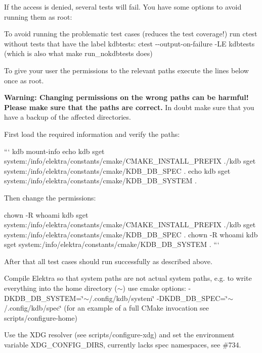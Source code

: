 If the access is denied, several tests will fail. You have some options to avoid running them as root\+:


\begin{DoxyEnumerate}
\item To avoid running the problematic test cases (reduces the test coverage!) run {\ttfamily ctest} without tests that have the label {\ttfamily kdbtests}\+: {\ttfamily ctest -\/-\/output-\/on-\/failure -\/\+LE kdbtests} (which is also what {\ttfamily make run\+\_\+nokdbtests} does)
\item To give your user the permissions to the relevant paths execute the lines below once as root.

{\bfseries Warning\+: Changing permissions on the wrong paths can be harmful! Please make sure that the paths are correct.} In doubt make sure that you have a backup of the affected directories.

First load the required information and verify the paths\+:

``` kdb mount-\/info echo {\ttfamily kdb sget system\+:/info/elektra/constants/cmake/\+C\+M\+A\+K\+E\+\_\+\+I\+N\+S\+T\+A\+L\+L\+\_\+\+P\+R\+E\+F\+IX .}/{\ttfamily kdb sget system\+:/info/elektra/constants/cmake/\+K\+D\+B\+\_\+\+D\+B\+\_\+\+S\+P\+EC .} echo {\ttfamily kdb sget system\+:/info/elektra/constants/cmake/\+K\+D\+B\+\_\+\+D\+B\+\_\+\+S\+Y\+S\+T\+EM .} 
\begin{DoxyCode}
Then change the permissions:
\end{DoxyCode}
 chown -\/R {\ttfamily whoami} {\ttfamily kdb sget system\+:/info/elektra/constants/cmake/\+C\+M\+A\+K\+E\+\_\+\+I\+N\+S\+T\+A\+L\+L\+\_\+\+P\+R\+E\+F\+IX .}/{\ttfamily kdb sget system\+:/info/elektra/constants/cmake/\+K\+D\+B\+\_\+\+D\+B\+\_\+\+S\+P\+EC .} chown -\/R {\ttfamily whoami} {\ttfamily kdb sget system\+:/info/elektra/constants/cmake/\+K\+D\+B\+\_\+\+D\+B\+\_\+\+S\+Y\+S\+T\+EM .} ```

After that all test cases should run successfully as described above.
\item Compile Elektra so that system paths are not actual system paths, e.\+g. to write everything into the home directory ({\ttfamily $\sim$}) use cmake options\+: {\ttfamily -\/\+D\+K\+D\+B\+\_\+\+D\+B\+\_\+\+S\+Y\+S\+T\+EM=\char`\"{}$\sim$/.\+config/kdb/system\char`\"{} -\/\+D\+K\+D\+B\+\_\+\+D\+B\+\_\+\+S\+P\+EC=\char`\"{}$\sim$/.\+config/kdb/spec\char`\"{}} (for an example of a full C\+Make invocation see {\ttfamily scripts/configure-\/home})
\item Use the X\+DG resolver (see {\ttfamily scripts/configure-\/xdg}) and set the environment variable {\ttfamily X\+D\+G\+\_\+\+C\+O\+N\+F\+I\+G\+\_\+\+D\+I\+RS}, currently lacks {\ttfamily spec} namespaces, see \#734.
\end{DoxyEnumerate}

